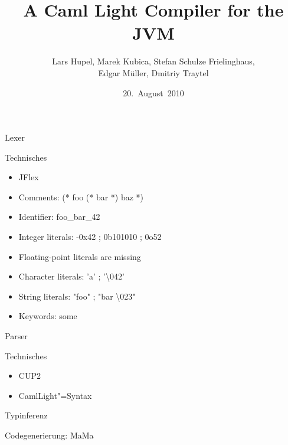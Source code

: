 \documentclass[hyperref={pdfpagelabels=false}]{beamer}
\title{A Caml Light Compiler for the JVM}
\author[Hupel, Kubica, Schulze Frielinghaus, Müller, Traytel]{Lars Hupel, Marek Kubica, Stefan Schulze Frielinghaus, \\Edgar Müller, Dmitriy Traytel}
\institute{TU~München}
\date{20.~August~2010}
\begin{document}
\frame{\titlepage}


\begin{frame}{Lexer}
  \begin{block}{Technisches}
    \begin{itemize}
      \item JFlex
      \item Comments: (* foo (* bar *) baz *)
      \item Identifier: foo\_bar\_42
      \item Integer literals: -0x42 ; 0b101010 ; 0o52
      \item Floating-point literals are missing
      \item Character literals: 'a' ; '\textbackslash 042'
      \item String literals: "foo" ; "bar \textbackslash 023"
      \item Keywords: some
    \end{itemize}
  \end{block}
\end{frame}

\begin{frame}{Parser}
  \begin{block}{Technisches}
    \begin{itemize}
      \item CUP2
      \item CamlLight"=Syntax
    \end{itemize}
  \end{block}
\end{frame}

\begin{frame}{Typinferenz}
\end{frame}

\begin{frame}{Codegenerierung: MaMa}
\end{frame}
\end{document}
